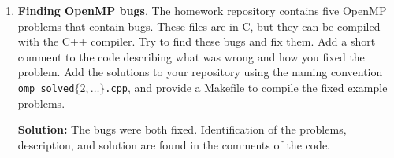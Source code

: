 \documentclass[10pt]{article}
\begin{document}
\begin{enumerate}
Looping at the flop rates in Fig. \ref{floprate} we see that the OpenMP implementation with 4 threads achieves near half the optimal flop rate, but this is more visible at large matrices ($N=512, 1024$) which the computational effort per loop iteration is large (since we only parallelize the outer loop). \qed





\item \textbf{Finding OpenMP bugs}. The homework repository contains five OpenMP problems that contain bugs. These files are in C, but they can be compiled with the C++ compiler. Try to find these bugs and fix them. Add a short comment to the code describing what was wrong and how you fixed the problem. Add the solutions to your repository using the naming convention \texttt{omp\_solved$\{2,\dotsc\}$.cpp}, and provide a Makefile to compile the fixed example problems.

\textbf{Solution:} The bugs were both fixed. Identification of the problems, description, and solution are found in the comments of the code.









\end{enumerate}
\end{document}
